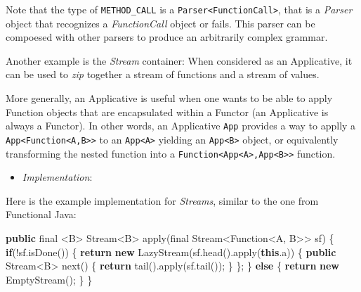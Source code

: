 \documentclass[11pt,]{article}
\newenvironment{Shaded}{}{}
\newcommand{\KeywordTok}[1]{\textcolor[rgb]{0.00,0.44,0.13}{\textbf{{#1}}}}
\newcommand{\DataTypeTok}[1]{\textcolor[rgb]{0.56,0.13,0.00}{{#1}}}
\newcommand{\FunctionTok}[1]{\textcolor[rgb]{0.02,0.16,0.49}{{#1}}}
\newcommand{\NormalTok}[1]{{#1}}
\begin{document}
Note that the type of \texttt{METHOD\_CALL} is a
\texttt{Parser\textless{}FunctionCall\textgreater{}}, that is a
\emph{Parser} object that recognizes a \emph{FunctionCall} object or
fails. This parser can be compoesed with other parsers to produce an
arbitrarily complex grammar.

Another example is the \emph{Stream} container: When considered as an
Applicative, it can be used to \emph{zip} together a stream of functions
and a stream of values.

More generally, an Applicative is useful when one wants to be able to
apply Function objects that are encapsulated within a Functor (an
Applicative is always a Functor). In other words, an Applicative
\texttt{App} provides a way to applly a
\texttt{App\textless{}Function\textless{}A,B\textgreater{}\textgreater{}}
to an \texttt{App\textless{}A\textgreater{}} yielding an
\texttt{App\textless{}B\textgreater{}} object, or equivalently
transforming the nested function into a
\texttt{Function\textless{}App\textless{}A\textgreater{},App\textless{}B\textgreater{}\textgreater{}}
function.

\begin{itemize}
\item
  \emph{Implementation}:
\end{itemize}

Here is the example implementation for \emph{Streams}, similar to the
one from Functional Java:

\begin{Shaded}
\begin{Highlighting}[]
  \KeywordTok{public} \DataTypeTok{final} \NormalTok{<B> Stream<B> }\FunctionTok{apply}\NormalTok{(}\DataTypeTok{final} \NormalTok{Stream<Function<A, B>> sf) \{}
    \KeywordTok{if}\NormalTok{(!sf.}\FunctionTok{isDone}\NormalTok{()) \{}
      \KeywordTok{return} \KeywordTok{new} \FunctionTok{LazyStream}\NormalTok{(sf.}\FunctionTok{head}\NormalTok{().}\FunctionTok{apply}\NormalTok{(}\KeywordTok{this}\NormalTok{.}\FunctionTok{a}\NormalTok{)) \{}
         \KeywordTok{public} \NormalTok{Stream<B> }\FunctionTok{next}\NormalTok{() \{}
           \KeywordTok{return} \FunctionTok{tail}\NormalTok{().}\FunctionTok{apply}\NormalTok{(sf.}\FunctionTok{tail}\NormalTok{());}
         \NormalTok{\}}
      \NormalTok{\};}
    \NormalTok{\} }\KeywordTok{else} \NormalTok{\{}
      \KeywordTok{return} \KeywordTok{new} \FunctionTok{EmptyStream}\NormalTok{();}
  \NormalTok{\}}
\NormalTok{\}}
\end{Highlighting}
\end{Shaded}
\end{document}

